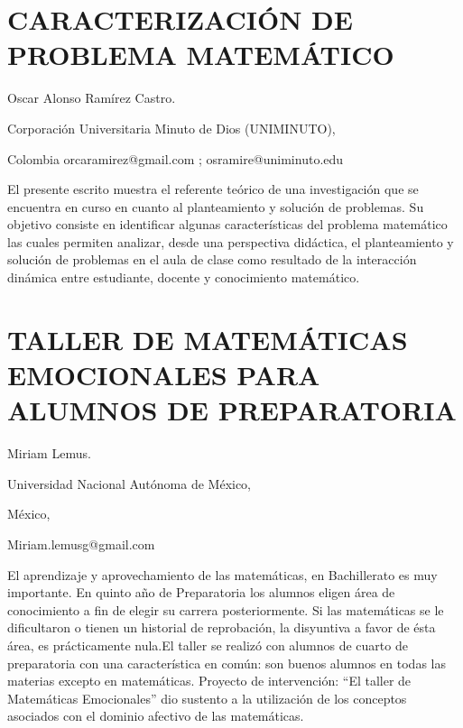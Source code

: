 \setcounter{section}{182}


\section{CARACTERIZACIÓN DE PROBLEMA MATEMÁTICO}

\begin{datos}

Oscar Alonso Ramírez Castro.

Corporación Universitaria Minuto de Dios (UNIMINUTO),

Colombia orcaramirez@gmail.com ; osramire@uniminuto.edu

\end{datos}

El presente escrito muestra el referente teórico de una investigación
que se encuentra en curso en cuanto al planteamiento y solución de
problemas. Su objetivo consiste en identificar algunas características
del problema matemático las cuales permiten analizar, desde una perspectiva
didáctica, el planteamiento y solución de problemas en el aula de
clase como resultado de la interacción dinámica entre estudiante,
docente y conocimiento matemático.

\setcounter{section}{185}


\section{TALLER DE MATEMÁTICAS EMOCIONALES PARA ALUMNOS DE PREPARATORIA}

\begin{datos}

Miriam Lemus.

Universidad Nacional Autónoma de México,

México,

Miriam.lemusg@gmail.com 

\end{datos}

El aprendizaje y aprovechamiento de las matemáticas, en Bachillerato
es muy importante. En quinto año de Preparatoria los alumnos eligen
área de conocimiento a fin de elegir su carrera posteriormente. Si
las matemáticas se le dificultaron o tienen un historial de reprobación,
la disyuntiva a favor de ésta área, es prácticamente nula.El taller
se realizó con alumnos de cuarto de preparatoria con una característica
en común: son buenos alumnos en todas las materias excepto en matemáticas.
Proyecto de intervención: “El taller de Matemáticas Emocionales” dio
sustento a la utilización de los conceptos asociados con el dominio
afectivo de las matemáticas.


